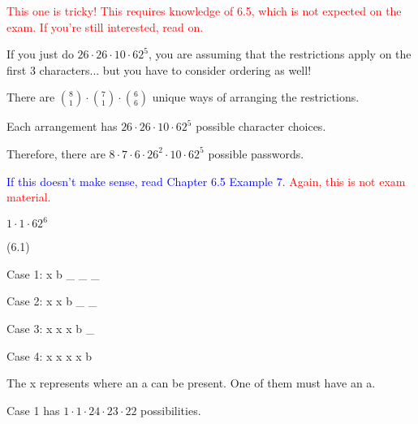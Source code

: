 \documentclass{exam}
\begin{document}
\begin{questions}
\begin{subparts}

\begin{center}

\textcolor{red}{This one is tricky! This requires knowledge of 6.5, which is not expected on the exam. If you're still interested, read on.}

If you just do \( 26 \cdot 26 \cdot 10 \cdot 62^5 \), you are assuming that the restrictions apply on the first 3 characters... but you have to consider ordering as well!

There are \({8 \choose 1} \cdot {7 \choose 1} \cdot {6 \choose 6}\) unique ways of arranging the restrictions. 

Each arrangement has \(26 \cdot 26 \cdot 10 \cdot 62^5\) possible character choices.

Therefore, there are \(8 \cdot 7 \cdot 6 \cdot 26^2 \cdot 10 \cdot 62^5\) possible passwords.

\textcolor{blue}{If this doesn't make sense, read Chapter 6.5 Example 7.}
\textcolor{red}{Again, this is not exam material.}

\end{center}


\begin{center}

\( 1 \cdot 1 \cdot 62^6 \)

\end{center}

\end{subparts}

 (6.1)

\begin{center}

Case 1: x b \_ \_ \_

Case 2: x x b \_ \_

Case 3: x x x b \_

Case 4: x x x x b

The x represents where an a can be present. One of them must have an a.

Case 1 has \(1 \cdot 1 \cdot 24 \cdot 23 \cdot 22\) possibilities.


\end{center}
\end{questions}
\end{document}
